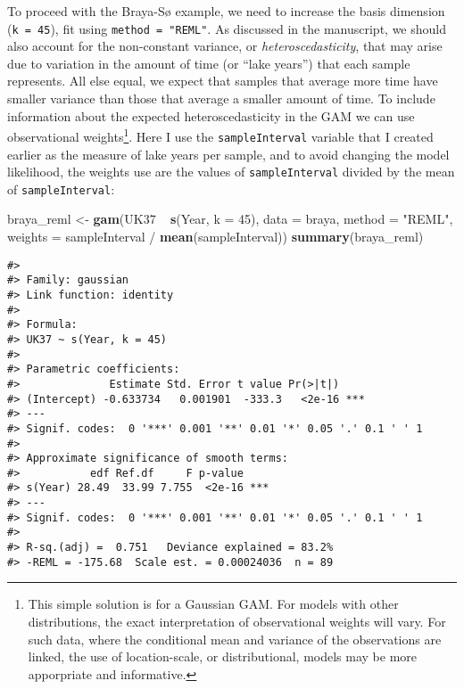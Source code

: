 \documentclass[12pt,]{article}
\newenvironment{Shaded}{\begin{snugshade}}{\end{snugshade}}
\newcommand{\KeywordTok}[1]{\textcolor[rgb]{0.13,0.29,0.53}{\textbf{{#1}}}}
\newcommand{\DataTypeTok}[1]{\textcolor[rgb]{0.13,0.29,0.53}{{#1}}}
\newcommand{\DecValTok}[1]{\textcolor[rgb]{0.00,0.00,0.81}{{#1}}}
\newcommand{\StringTok}[1]{\textcolor[rgb]{0.31,0.60,0.02}{{#1}}}
\newcommand{\NormalTok}[1]{{#1}}
\let\rmarkdownfootnote\footnote%
\def\footnote{\protect\rmarkdownfootnote}
\begin{document}
To proceed with the Braya-Sø example, we need to increase the basis
dimension (\texttt{k\ =\ 45}), fit using \texttt{method\ =\ "REML"}. As
discussed in the manuscript, we should also account for the non-constant
variance, or \emph{heteroscedasticity}, that may arise due to variation
in the amount of time (or ``lake years'') that each sample represents.
All else equal, we expect that samples that average more time have
smaller variance than those that average a smaller amount of time. To
include information about the expected heteroscedasticity in the GAM we
can use observational weights\footnote{This simple solution is for a
  Gaussian GAM. For models with other distributions, the exact
  interpretation of observational weights will vary. For such data,
  where the conditional mean and variance of the observations are
  linked, the use of location-scale, or distributional, models may be
  more apporpriate and informative.}. Here I use the
\texttt{sampleInterval} variable that I created earlier as the measure
of lake years per sample, and to avoid changing the model likelihood,
the weights use are the values of \texttt{sampleInterval} divided by the
mean of \texttt{sampleInterval}:

\begin{Shaded}
\begin{Highlighting}[]
\NormalTok{braya_reml <-}\StringTok{ }\KeywordTok{gam}\NormalTok{(UK37 ~}\StringTok{ }\KeywordTok{s}\NormalTok{(Year, }\DataTypeTok{k =} \DecValTok{45}\NormalTok{), }\DataTypeTok{data =} \NormalTok{braya,}
                  \DataTypeTok{method =} \StringTok{"REML"}\NormalTok{,}
                  \DataTypeTok{weights =} \NormalTok{sampleInterval /}\StringTok{ }\KeywordTok{mean}\NormalTok{(sampleInterval))}
\KeywordTok{summary}\NormalTok{(braya_reml)}
\end{Highlighting}
\end{Shaded}

\begin{verbatim}
#> 
#> Family: gaussian 
#> Link function: identity 
#> 
#> Formula:
#> UK37 ~ s(Year, k = 45)
#> 
#> Parametric coefficients:
#>              Estimate Std. Error t value Pr(>|t|)    
#> (Intercept) -0.633734   0.001901  -333.3   <2e-16 ***
#> ---
#> Signif. codes:  0 '***' 0.001 '**' 0.01 '*' 0.05 '.' 0.1 ' ' 1
#> 
#> Approximate significance of smooth terms:
#>           edf Ref.df     F p-value    
#> s(Year) 28.49  33.99 7.755  <2e-16 ***
#> ---
#> Signif. codes:  0 '***' 0.001 '**' 0.01 '*' 0.05 '.' 0.1 ' ' 1
#> 
#> R-sq.(adj) =  0.751   Deviance explained = 83.2%
#> -REML = -175.68  Scale est. = 0.00024036  n = 89
\end{verbatim}
\end{document}
